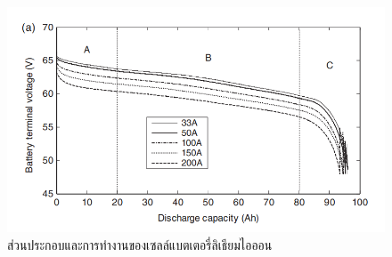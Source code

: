 \begin{center}
	\begin{figure}[!h]
		\includegraphics[width=0.6\linewidth]{Chapters/img/IV_a.png}
			\centering
			\captionsetup{justification=centering,margin=2cm}
			\caption{ส่วนประกอบและการทำงานของเซลล์แบตเตอรี่ลิเธียมไอออน}
	\end{figure}
\end{center}

